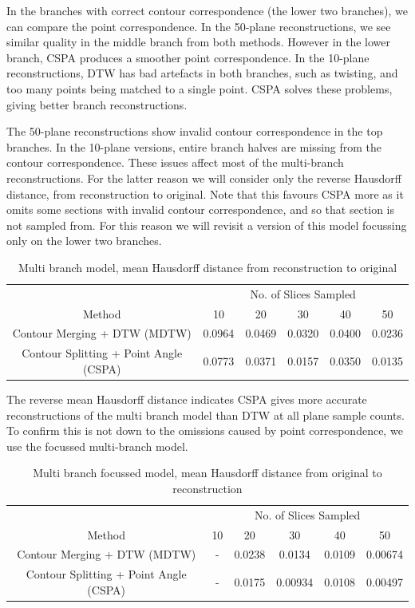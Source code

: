 \documentclass[11p, titlepage]{article}
\begin{document}
In the branches with correct contour correspondence (the lower two branches), we can compare the point correspondence. In the 50-plane reconstructions, we see similar quality in the middle branch from both methods. However in the lower branch, CSPA produces a smoother point correspondence. In the 10-plane reconstructions, DTW has bad artefacts in both branches, such as twisting, and too many points being matched to a single point. CSPA solves these problems, giving better branch reconstructions.

The 50-plane reconstructions show invalid contour correspondence in the top branches. In the 10-plane versions, entire branch halves are missing from the contour correspondence. These issues affect most of the multi-branch reconstructions. For the latter reason we will consider only the reverse Hausdorff distance, from reconstruction to original. Note that this favours CSPA more as it omits some sections with invalid contour correspondence, and so that section is not sampled from. For this reason we will revisit a version of this model focussing only on the lower two branches.

\begin{table}[h!]
\begin{tabular}{ | c | c | c | c | c | c | }
\hline
& \multicolumn{5}{c|}{No. of Slices Sampled} \\
\cline{2-6}
Method & 10 & 20 & 30 & 40 & 50 \\
\hline
Contour Merging + DTW (MDTW) & 0.0964 & 0.0469 & 0.0320 & 0.0400 & 0.0236 \\
Contour Splitting + Point Angle (CSPA) & 0.0773 & 0.0371 & 0.0157 & 0.0350 & 0.0135 \\
\hline
\end{tabular}
\caption{Multi branch model, mean Hausdorff distance from reconstruction to original}
\label{table:multi_branch_reverse}
\end{table}

The reverse mean Hausdorff distance indicates CSPA gives more accurate reconstructions of the multi branch model than DTW at all plane sample counts. To confirm this is not down to the omissions caused by point correspondence, we use the focussed multi-branch model.

\begin{table}[h!]
\begin{tabular}{ | c | c | c | c | c | c | }
\hline
& \multicolumn{5}{c|}{No. of Slices Sampled} \\
\cline{2-6}
Method & 10 & 20 & 30 & 40 & 50 \\
\hline
Contour Merging + DTW (MDTW) & - & 0.0238 & 0.0134 & 0.0109 & 0.00674 \\
Contour Splitting + Point Angle (CSPA) & - & 0.0175 & 0.00934 & 0.0108 & 0.00497 \\
\hline
\end{tabular}
\caption{Multi branch focussed model, mean Hausdorff distance from original to reconstruction}
\label{table:multi_branch_focussed_forward}
\end{table}
\end{document}
